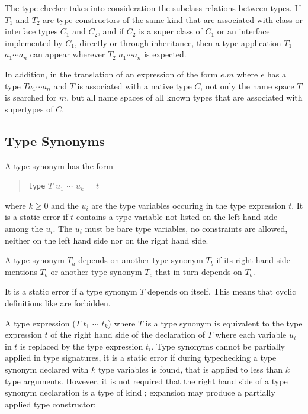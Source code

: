 The \frege{} type checker takes into consideration the subclass relations between \java{} types. If $T_1$ and $T_2$ are type constructors of the same kind that are associated with \java{} class or interface types $C_1$ and $C_2$, and if $C_2$ is a super class of $C_1$ or an interface implemented by $C_1$, directly or through inheritance, then a type application $T_1$ $a_1 \cdots{} a_n$ can appear wherever $T_2$ $a_1 \cdots{} a_n$ is expected.

In addition, in the translation of an expression of the form $e.m$ where $e$ has a type $T a_1 \cdots{} a_n$ and $T$ is associated with a native type $C$, not only the name space $T$ is searched for $m$, but all name spaces of all known types that are associated with supertypes of $C$.

\subsection{Type Synonyms} \label{typedcl} 

\begin{flushleft}
    \sym{=} 
\end{flushleft}

A type synonym has the form
\begin{quote}
\texttt{type} $T$ $u_1$ $\cdots$ $u_k$ = $t$
\end{quote}
where $k\ge 0$ and the $u_i$ are the type variables occuring in the type expression $t$. It is a static error if $t$ contains a type variable not listed on the left hand side among the $u_i$. The $u_i$ must be bare type variables, no constraints are allowed, neither on the left hand side nor on the right hand side.

A type synonym $T_a$ depends on another type synonym $T_b$ if its right hand side mentions $T_b$ or another type synonym $T_c$ that in turn depends on $T_b$.

It is a static error if a type synonym $T$ depends on itself.
This means that cyclic definitions like 
are forbidden.

A type expression ($T$ $t_1$ $\cdots$ $t_k$) where $T$ is a type synonym is equivalent to the type expression $t$ of the right hand side of the declaration of $T$ where each variable $u_i$ in $t$ is replaced by the type expression $t_i$. Type synonyms cannot be partially applied in type signatures, it is a static error if during typechecking a type synonym declared with $k$ type variables is found, that is applied to less than $k$ type arguments. However, it is not required that the right hand side of a type synonym declaration is a type of kind \sym{*}; expansion may produce a partially applied type constructor:

